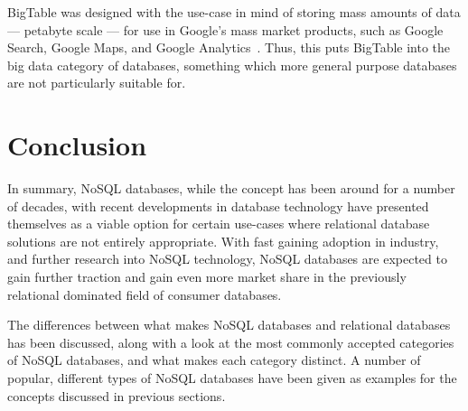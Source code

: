 \documentclass{article}
\begin{document}
BigTable was designed with the use-case in mind of storing mass amounts of data --- petabyte scale --- for use
in Google's mass market products, such as Google Search, Google Maps, and Google Analytics~\cite{chang2008bigtable}.
Thus, this puts BigTable into the big data category of databases, something which more general purpose databases are not
particularly suitable for.





\section{Conclusion} %
\label{sec:conclusion}

In summary, NoSQL databases, while the concept has been around for a number of decades, with recent developments
in database technology have presented themselves as a viable option for certain use-cases where relational
database solutions are not entirely appropriate. With fast gaining adoption in industry, and further research
into NoSQL technology, NoSQL databases are expected to gain further traction and gain even more market 
share in the previously relational dominated field of consumer databases.

The differences between what makes NoSQL databases and relational databases has been discussed,
along with a look at the most commonly accepted categories of NoSQL databases, and what makes each category
distinct. A number of popular, different types of NoSQL databases have been given as examples for the concepts
discussed in previous sections.


\newpage



\end{document}
